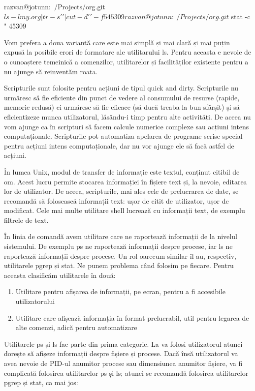 \begin{screen}
razvan@jotunn:~/Projects/org.git$ ls -l my.org | tr -s ' ' | cut -d ' ' -f 5
45309
razvan@jotunn:~/Projects/org.git$ stat -c "%
45309
\end{screen}

Vom prefera a doua variantă care este mai simplă și mai clară și mai puțin
expusă la posibile erori de formatare ale utilitarului ls. Pentru aceasta e
nevoie de o cunoaștere temeinică a comenzilor, utilitarelor și facilităților
existente pentru a nu ajunge să reinventăm roata.

Scripturile sunt folosite pentru acțiuni de tipul quick and dirty. Scripturile
nu urmăresc să fie eficiente din punct de vedere al consumului de resurse
(rapide, memorie redusă) ci urmăresc să fie eficace (să ducă treaba la bun
sfârșit) și să eficientizeze munca utilizatorul, lăsându-i timp pentru alte
activități. De aceea nu vom ajunge ca în scripturi să facem calcule numerice
complexe sau acțiuni intens computaționale. Scripturile pot automatiza apelarea
de programe scrise special pentru acțiuni intens computaționale, dar nu vor
ajunge ele să facă astfel de acțiuni.

În lumea Unix, modul de transfer de informație este textul, conținut citibil de
om. Acest lucru permite stocarea informației în fișiere text și, la nevoie,
editarea lor de utilizator. De aceea, scripturile, mai ales cele de prelucrarea
de date, se recomandă să folosească informații text: ușor de citit de
utilizator, ușor de modificat. Cele mai multe utilitare shell lucrează cu
informații text, de exemplu filtrele de text.

În linia de comandă avem utilitare care ne raportează informații de la nivelul
sistemului. De exemplu ps ne raportează informații despre procese, iar ls ne
raportează informații despre procese. Un rol oarecum similar îl au, respectiv,
utilitarele pgrep și stat. Ne punem problema când folosim pe fiecare. Pentru
aceasta clasificăm utilitarele în două:

\begin{enumerate}
	\item Utilitare pentru afișarea de informații, pe ecran, pentru a fi
		accesibile utilizatorului
	\item Utilitare care afișează informația în format prelucrabil, util
		pentru legarea de alte comenzi, adică pentru automatizare
\end{enumerate}

Utilitarele ps și ls fac parte din prima categorie. La va folosi utilizatorul
atunci dorește să afișeze informații despre fișiere și procese. Dacă însă
utilizatorul va avea nevoie de PID-ul anumitor procese sau dimensiunea anumitor
fișiere, va fi complicată folosirea utilitarelor ps și ls; atunci se recomandă
folosirea utilitarelor pgrep și stat, ca mai jos:

